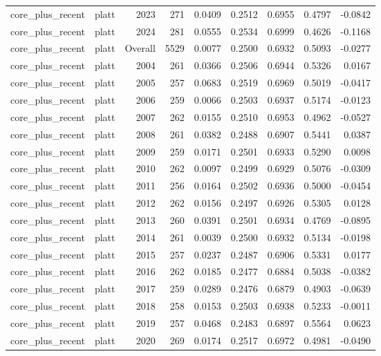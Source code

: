\begin{table}[t]
\begin{tabular}{@{} l l r r r r r r r @{} }
      core\_plus\_recent & platt & 2023 & 271 & 0.0409 & 0.2512 & 0.6955 & 0.4797 & -0.0842 \\
      core\_plus\_recent & platt & 2024 & 281 & 0.0555 & 0.2534 & 0.6999 & 0.4626 & -0.1168 \\
      core\_plus\_recent & platt & Overall & 5529 & 0.0077 & 0.2500 & 0.6932 & 0.5093 & -0.0277 \\
      core\_plus\_recent & platt & 2004 & 261 & 0.0366 & 0.2506 & 0.6944 & 0.5326 & 0.0167 \\
      core\_plus\_recent & platt & 2005 & 257 & 0.0683 & 0.2519 & 0.6969 & 0.5019 & -0.0417 \\
      core\_plus\_recent & platt & 2006 & 259 & 0.0066 & 0.2503 & 0.6937 & 0.5174 & -0.0123 \\
      core\_plus\_recent & platt & 2007 & 262 & 0.0155 & 0.2510 & 0.6953 & 0.4962 & -0.0527 \\
      core\_plus\_recent & platt & 2008 & 261 & 0.0382 & 0.2488 & 0.6907 & 0.5441 & 0.0387 \\
      core\_plus\_recent & platt & 2009 & 259 & 0.0171 & 0.2501 & 0.6933 & 0.5290 & 0.0098 \\
      core\_plus\_recent & platt & 2010 & 262 & 0.0097 & 0.2499 & 0.6929 & 0.5076 & -0.0309 \\
      core\_plus\_recent & platt & 2011 & 256 & 0.0164 & 0.2502 & 0.6936 & 0.5000 & -0.0454 \\
      core\_plus\_recent & platt & 2012 & 262 & 0.0156 & 0.2497 & 0.6926 & 0.5305 & 0.0128 \\
      core\_plus\_recent & platt & 2013 & 260 & 0.0391 & 0.2501 & 0.6934 & 0.4769 & -0.0895 \\
      core\_plus\_recent & platt & 2014 & 261 & 0.0039 & 0.2500 & 0.6932 & 0.5134 & -0.0198 \\
      core\_plus\_recent & platt & 2015 & 257 & 0.0237 & 0.2487 & 0.6906 & 0.5331 & 0.0177 \\
      core\_plus\_recent & platt & 2016 & 262 & 0.0185 & 0.2477 & 0.6884 & 0.5038 & -0.0382 \\
      core\_plus\_recent & platt & 2017 & 259 & 0.0289 & 0.2476 & 0.6879 & 0.4903 & -0.0639 \\
      core\_plus\_recent & platt & 2018 & 258 & 0.0153 & 0.2503 & 0.6938 & 0.5233 & -0.0011 \\
      core\_plus\_recent & platt & 2019 & 257 & 0.0468 & 0.2483 & 0.6897 & 0.5564 & 0.0623 \\
      core\_plus\_recent & platt & 2020 & 269 & 0.0174 & 0.2517 & 0.6972 & 0.4981 & -0.0490 \\

\end{tabular}
\end{table}
